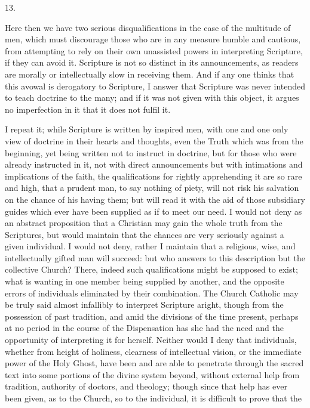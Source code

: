 13.

Here then we have two serious disqualifications in the case of the
multitude of men, which must discourage those who are in any measure
humble and cautious, from attempting to rely on their own
unassisted powers in interpreting Scripture, if they can avoid it.
Scripture is not so distinct in its announcements, as readers are
morally or intellectually slow in receiving them. And if any one
thinks that this avowal is derogatory to Scripture, I answer that
Scripture was never intended to teach doctrine to the many; and if it
was not given with this object, it argues no imperfection in it that
it does not fulfil it.

I repeat it; while Scripture is written by inspired men, with one
and one only view of doctrine in their hearts and thoughts, even the
Truth which was from the beginning, yet being written not to instruct
in doctrine, but for those who were already instructed in it, not with
direct announcements but with intimations and implications of the
faith, the qualifications for rightly apprehending it are so rare and
high, that a prudent man, to say nothing of piety, will not risk his
salvation on the chance of his having them; but will read it with the
aid of those subsidiary guides which ever have been supplied as if to
meet our need. I would not deny as an abstract proposition that a
Christian may gain the whole truth from the Scriptures, but would
maintain that the chances are very seriously against a given
individual. I would not deny, rather I maintain that a religious,
wise, and intellectually gifted man will succeed: but who answers to
this description but the collective Church? There, indeed such
qualifications might be supposed to exist; what is wanting in one
member being supplied by another, and the opposite errors of
individuals eliminated by their combination. The Church Catholic may
be truly said almost infallibly to interpret Scripture aright, though
from the possession of past tradition, and amid the divisions of the
time present, perhaps at no period in the course of the Dispensation
has she had the need and the opportunity of interpreting it for
herself. Neither would I deny that individuals, whether from
height of holiness, clearness of intellectual vision, or the immediate
power of the Holy Ghost, have been and are able to penetrate through
the sacred text into some portions of the divine system beyond,
without external help from tradition, authority of doctors, and
theology; though since that help has ever been given, as to the
Church, so to the individual, it is difficult to prove that the
